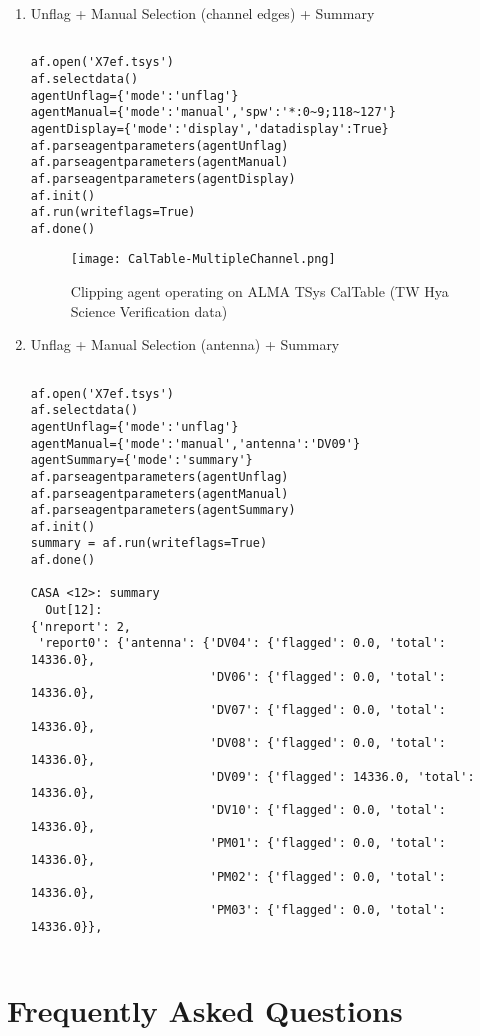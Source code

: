 \begin{enumerate}
\item Unflag + Manual Selection (channel edges) + Summary
\begin{verbatim}

af.open('X7ef.tsys')
af.selectdata()
agentUnflag={'mode':'unflag'}
agentManual={'mode':'manual','spw':'*:0~9;118~127'}
agentDisplay={'mode':'display','datadisplay':True}
af.parseagentparameters(agentUnflag)
af.parseagentparameters(agentManual)
af.parseagentparameters(agentDisplay)
af.init()
af.run(writeflags=True)
af.done() 

\end{verbatim}

\begin{figure}
\texttt{[image: CalTable-MultipleChannel.png]}
\caption{Clipping agent operating on ALMA TSys CalTable (TW Hya Science
Verification data)}
\label{Fig:TW Hya CalTable Clip}
\end{figure}

\item Unflag + Manual Selection (antenna) + Summary
\begin{verbatim}

af.open('X7ef.tsys')
af.selectdata()
agentUnflag={'mode':'unflag'}
agentManual={'mode':'manual','antenna':'DV09'}
agentSummary={'mode':'summary'}
af.parseagentparameters(agentUnflag)
af.parseagentparameters(agentManual)
af.parseagentparameters(agentSummary)
af.init()
summary = af.run(writeflags=True)
af.done() 

CASA <12>: summary
  Out[12]: 
{'nreport': 2,
 'report0': {'antenna': {'DV04': {'flagged': 0.0, 'total': 14336.0},
                         'DV06': {'flagged': 0.0, 'total': 14336.0},
                         'DV07': {'flagged': 0.0, 'total': 14336.0},
                         'DV08': {'flagged': 0.0, 'total': 14336.0},
                         'DV09': {'flagged': 14336.0, 'total': 14336.0},
                         'DV10': {'flagged': 0.0, 'total': 14336.0},
                         'PM01': {'flagged': 0.0, 'total': 14336.0},
                         'PM02': {'flagged': 0.0, 'total': 14336.0},
                         'PM03': {'flagged': 0.0, 'total': 14336.0}},


\end{verbatim}

\end{enumerate}


\section{Frequently Asked Questions}\label{Sec:FAQ}

